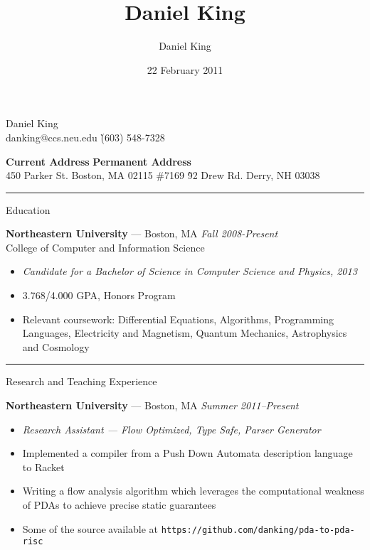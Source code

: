 \documentclass[10pt]{letter}
\author{Daniel King}
\title{Daniel King}
\date{22 February 2011}
\begin{document}
\begin{tabbing}{\Huge Daniel King} \\
\normalsize danking@ccs.neu.edu \`(603) 548-7328
\end{tabbing}

\vspace{-10pt}
\begin{tabbing}
\textbf{Current Address} \`\textbf{Permanent Address}\\
450 Parker St. Boston, MA 02115 \#7169 \`92 Drew Rd. Derry, NH 03038
\end{tabbing}\vspace{-15pt}
\rule{\linewidth}{.5pt}

{\Large Education}
\begin{tabbing}
{\large \bf Northeastern University} --- Boston, MA \` \textit{Fall 2008-Present} \\
College of Computer and Information Science
\end{tabbing}\vspace{-10pt}

\begin{itemize}
\setlength\itemsep{1pt}
\item [] {\textit{Candidate for a Bachelor of Science in Computer Science and
    Physics, 2013}}
\item{3.768/4.000 GPA, Honors Program}
\item{Relevant coursework: Differential Equations, Algorithms, Programming
  Languages, Electricity and Magnetism, Quantum Mechanics, Astrophysics and Cosmology}
\end{itemize}

\rule{\linewidth}{.5pt}

{\Large Research and Teaching Experience}

\begin{tabbing}
{\large \bf Northeastern University} --- Boston, MA \` \textit{Summer 2011--Present}

\end{tabbing}
\begin{itemize}
\setlength\itemsep{1pt}
\item [] {\textit{Research Assistant --- Flow Optimized, Type Safe, Parser
    Generator}}
\item{Implemented a compiler from a Push Down Automata description language to Racket}
\item{Writing a flow analysis algorithm which leverages the computational
  weakness of PDAs to achieve precise static guarantees}
\item{Some of the source available at
  \texttt{https://github.com/danking/pda-to-pda-risc}}
\end{itemize}
\end{document}

